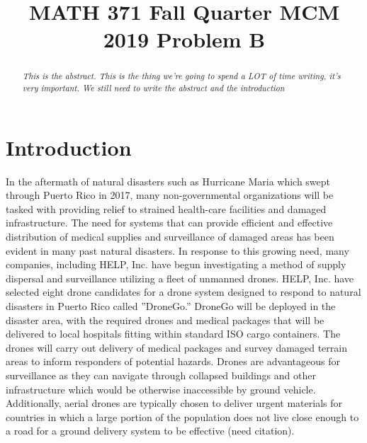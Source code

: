 \documentclass[twocolumn,10pt]{asme2ej}
\title{MATH 371 Fall Quarter MCM 2019 Problem B}
\begin{document}
\maketitle


\begin{abstract}
{\it This is the abstract. This is the thing we're going to spend a LOT of time writing, it's very important. We still need to write the abstract and the introduction
}
\end{abstract}



\section{Introduction}
In the aftermath of natural disasters such as Hurricane Maria which swept through Puerto Rico in 2017, many non-governmental organizations will be tasked with providing relief to strained health-care facilities and damaged infrastructure. The need for systems that can provide efficient and effective distribution of medical supplies and surveillance of damaged areas has been evident in many past natural disasters. In response to this growing need, many companies, including HELP, Inc. have begun investigating a method of supply dispersal and surveillance utilizing a fleet of unmanned drones. HELP, Inc. have selected eight drone candidates for a drone system designed to respond to natural disasters in Puerto Rico called ”DroneGo.” DroneGo will be deployed in the disaster area, with the required drones and medical packages that will be delivered to local hospitals fitting within standard ISO cargo containers. The drones will carry out delivery of medical packages and survey damaged terrain areas to inform responders of potential hazards. Drones are advantageous for surveillance as they can navigate through collapsed buildings and other infrastructure which would be otherwise inaccessible by ground vehicle. Additionally, aerial drones are typically chosen to deliver urgent materials for countries in which a large portion of the population does not live close enough to a road for a ground delivery system to be effective (need citation).
\end{document}

